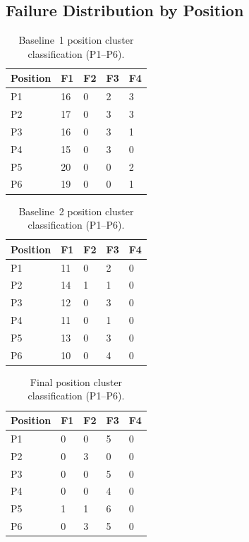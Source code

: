 \documentclass[oneside,studentpaper]{wbk}
\begin{document}
\subsection{Failure Distribution by Position}
\label{sec:failure-distribution-by-position}

\begin{table}[htbp]
  \centering
  \caption{Baseline~1 position cluster classification (P1--P6).}
  \label{tab:baseline1-position-clusters}
  \begin{tabular}{lllll}
    \toprule
    Position & F1 & F2 & F3 & F4 \\
    \midrule
    P1 & 16 & 0 & 2 & 3 \\
    P2 & 17 & 0 & 3 & 3 \\
    P3 & 16 & 0 & 3 & 1 \\
    P4 & 15 & 0 & 3 & 0 \\
    P5 & 20 & 0 & 0 & 2 \\
    P6 & 19 & 0 & 0 & 1 \\
    \bottomrule
  \end{tabular}
\end{table}

\begin{table}[htbp]
  \centering
  \caption{Baseline~2 position cluster classification (P1--P6).}
  \label{tab:baseline2-position-clusters}
  \begin{tabular}{lllll}
    \toprule
    Position & F1 & F2 & F3 & F4 \\
    \midrule
    P1 & 11 & 0 & 2 & 0 \\
    P2 & 14 & 1 & 1 & 0 \\
    P3 & 12 & 0 & 3 & 0 \\
    P4 & 11 & 0 & 1 & 0 \\
    P5 & 13 & 0 & 3 & 0 \\
    P6 & 10 & 0 & 4 & 0 \\
    \bottomrule
  \end{tabular}
\end{table}

\begin{table}[htbp]
  \centering
  \caption{Final position cluster classification (P1--P6).}
  \label{tab:final-position-clusters}
  \begin{tabular}{lllll}
    \toprule
    Position & F1 & F2 & F3 & F4 \\
    \midrule
    P1 & 0 & 0 & 5 & 0 \\
    P2 & 0 & 3 & 0 & 0 \\
    P3 & 0 & 0 & 5 & 0 \\
    P4 & 0 & 0 & 4 & 0 \\
    P5 & 1 & 1 & 6 & 0 \\
    P6 & 0 & 3 & 5 & 0 \\
    \bottomrule
  \end{tabular}
\end{table}
\end{document}
